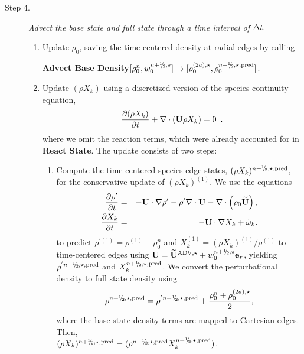 \begin{description}
\item[Step 4.] {\em Advect the base state and full state through a time interval of $\Delta t.$}

\begin{enumerate}
\renewcommand{\theenumi}{{\bf \Alph{enumi}}}

\item Update $\rho_0$, saving the time-centered density at radial edges by calling

{\bf Advect Base Density}$[\rho_0^{n},w_0^{\nph,\star}] \rightarrow [\rho_0^{(2a),\star}, \rho_0^{\nph,\star,\pred}]$.

\item Update $(\rho X_k)$ using a discretized version of the species 
continuity equation,
\begin{equation}
\frac{\partial (\rho X_k)}{\partial t} + \nabla \cdot ({\bf U} \rho X_k) = 0 \enskip .
\label{eq:species}
\end{equation}
where we omit the reaction terms, which were already 
accounted for in {\bf React State}.  The update consists of two steps:

\begin{enumerate}
\renewcommand{\labelenumii}{{\bf \roman{enumii}}.}

\item Compute the time-centered species edge states, $(\rho X_k)^{\nph,\star,\pred}$,
  for the conservative update of $(\rho X_k)^{(1)}$.  We use the equations 
\begin{eqnarray}
\frac{\partial\rho'}{\partial t} &=& -{\bf U}\cdot\nabla\rho' - 
     \rho'\nabla\cdot{\bf U} - \nabla\cdot\left(\rho_0\widetilde{{\bf U}}\right),
     \label{eq:Perturbational Density}  \\
\frac{\partial X_k}{\partial t} &=& -{\bf U}\cdot\nabla X_k + 
     \dot{\omega}_k. \label{eq:Primitive Species}
\end{eqnarray}
  to
  predict $\rho^{'(1)} = \rho^{(1)} - \rho_0^n$ and 
  $X_k^{(1)} = (\rho  X_k)^{(1)} / \rho^{(1)}$ to time-centered edges using 
  $\Ub = \uadvone+w_0^{\nph,\star}\eb_r$, yielding $\rho^{'\nph,\star,\pred}$ 
  and $X_k^{\nph,\star,\pred}$.
  We convert the perturbational density to full state density using
\begin{equation}
\rho^{\nph,\star,\pred} = \rho^{'\nph,\star,\pred} + \frac{\rho_0^n + \rho_0^{(2a),\star}}{2},
\end{equation}
  where the base state density terms are mapped to Cartesian edges.
  Then,\\
  $(\rho X_k)^{\nph,\star,\pred} = (\rho^{\nph,\star,\pred}X_k^{\nph,\star,\pred})$.


\end{enumerate}
\end{enumerate}
\end{description}
